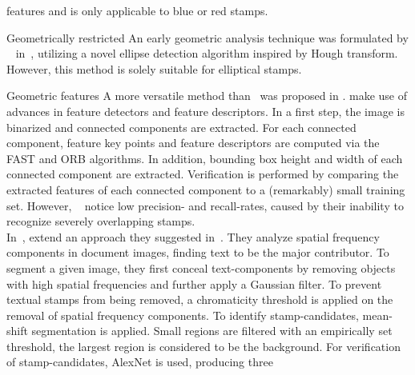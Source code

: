 \begin{description}
\begin{enumerate*}[label={\alph*)},font={\color{red!50!black}\bfseries}]
                    features and is only applicable to blue or red stamps.\\
                \item [Geometrically restricted]
                    An early geometric analysis technique was formulated by
                    ~\citeauthor*{Zhu.2006} in~\cite{Zhu.2006}, utilizing a
                    novel ellipse detection algorithm inspired by Hough
                    transform. However, this method is solely suitable for
                    elliptical stamps.
        \end{enumerate*}
    \item [Generic approaches]
    \begin{enumerate*}[label={\alph*)},font={\color{red!50!black}\bfseries}]
        \item [Geometric features]
        A more versatile method than~\cite{Zhu.2006} was proposed in
        \cite{Ahmed.2013082520130828, Ahmed.2016}.
        \citeauthor*{Ahmed.2013082520130828} make use of advances in
        feature detectors and feature descriptors. In a first step, the
        image is binarized and connected components are extracted. For each
        connected component, feature key points and feature descriptors are
        computed via the FAST and ORB algorithms. In addition, bounding box
        height and width of each connected component are extracted.
        Verification is performed by comparing the extracted features of each
        connected component to a (remarkably) small training set. However,
        ~\citeauthor*{Ahmed.2013082520130828} notice low precision-
        and recall-rates, caused by their inability to recognize severely
        overlapping stamps.\\
        In~\cite{Nandedkar.2015121620151219},
        \citeauthor*{Nandedkar.2015121620151219} extend an approach they
        suggested in~\cite{Nandedkar.2015082320150826}. They analyze spatial
        frequency components in document images, finding text to be the major
        contributor. To segment a given image, they first conceal
        text-components by removing objects with high spatial frequencies and
        further apply a Gaussian filter. To prevent textual stamps from being
        removed, a chromaticity threshold is applied on the removal of spatial
        frequency components. To identify stamp-candidates, mean-shift
        segmentation is applied. Small regions are filtered with an empirically
        set threshold, the largest region is considered to be the background.
        For verification of stamp-candidates, AlexNet is used, producing three

\end{enumerate*}
\end{description}
